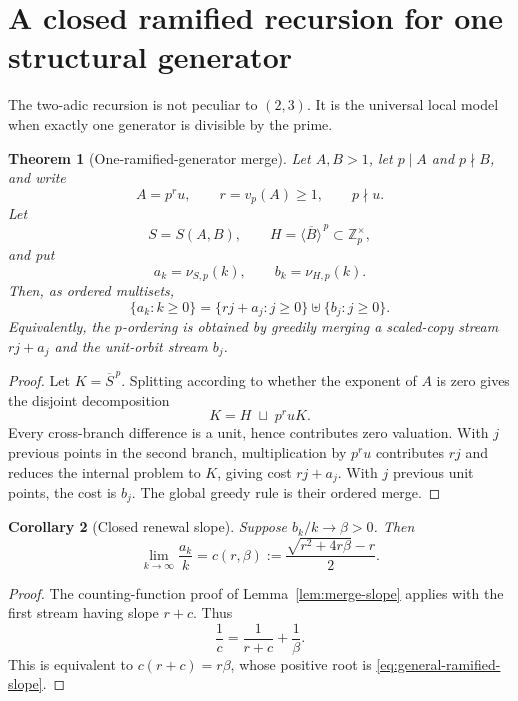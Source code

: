 \documentclass[11pt,oneside]{article}
\newtheorem{theorem}{Theorem}[section]
\newtheorem{corollary}[theorem]{Corollary}
\theoremstyle{definition}
\theoremstyle{remark}
\newcommand{\Z}{\mathbb Z}
\begin{document}
\section{A closed ramified recursion for one structural generator}
\label{sec:one-ramified}

The two-adic recursion is not peculiar to \((2,3)\).  It is the universal local model when
exactly one generator is divisible by the prime.

\begin{theorem}[One-ramified-generator merge]
\label{thm:one-ramified-merge}
Let \(A,B>1\), let \(p\mid A\) and \(p\nmid B\), and write
\[
 A=p^r u,
 \qquad r=v_p(A)\ge1,
 \qquad p\nmid u.
\]
Let
\[
 S=S(A,B),
 \qquad
 H=\overline{\langle B\rangle}^{\,p}\subset\Z_p^\times,
\]
and put
\[
 a_k=\nu_{S,p}(k),
 \qquad
 b_k=\nu_{H,p}(k).
\]
Then, as ordered multisets,
\begin{equation}
 \boxed{
 \{a_k:k\ge0\}
 =
 \{rj+a_j:j\ge0\}\uplus\{b_j:j\ge0\}.}
 \label{eq:general-ramified-merge}
\end{equation}
Equivalently, the \(p\)-ordering is obtained by greedily merging a scaled-copy stream
\(rj+a_j\) and the unit-orbit stream \(b_j\).
\end{theorem}

\begin{proof}
Let \(K=\overline S^{\,p}\).  Splitting according to whether the exponent of \(A\) is zero
gives the disjoint decomposition
\begin{equation}
 K=H\;\sqcup\;p^ruK.
 \label{eq:general-K-split}
\end{equation}
Every cross-branch difference is a unit, hence contributes zero valuation.  With \(j\)
previous points in the second branch, multiplication by \(p^ru\) contributes \(rj\) and
reduces the internal problem to \(K\), giving cost \(rj+a_j\).  With \(j\) previous unit
points, the cost is \(b_j\).  The global greedy rule is their ordered merge.
\end{proof}

\begin{corollary}[Closed renewal slope]
\label{cor:general-ramified-slope}
Suppose \(b_k/k\to\beta>0\).  Then
\begin{equation}
 \boxed{
 \lim_{k\to\infty}\frac{a_k}{k}
 =c(r,\beta)
 :=\frac{\sqrt{r^2+4r\beta}-r}{2}.}
 \label{eq:general-ramified-slope}
\end{equation}
\end{corollary}

\begin{proof}
The counting-function proof of Lemma~\ref{lem:merge-slope} applies with the first stream
having slope \(r+c\).  Thus
\[
 \frac1c=\frac1{r+c}+\frac1\beta.
\]
This is equivalent to \(c(r+c)=r\beta\), whose positive root is
\eqref{eq:general-ramified-slope}.
\end{proof}
\end{document}
